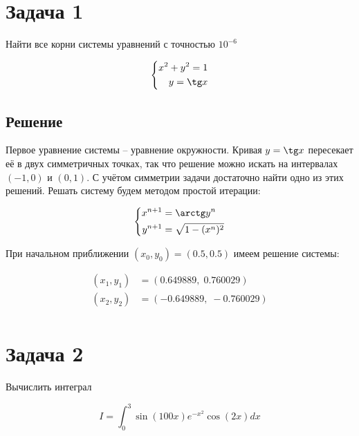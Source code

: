 \documentclass[a4paper,12pt]{article}
\begin{document}
\section*{Задача 1}

Найти все корни системы уравнений с точностью $10^{-6}$

\begin{equation*}
    \left\{
        \begin{aligned}
            x^2 + y^2 = 1 \\
            y = \tg x
        \end{aligned}
    \right.
\end{equation*}

\subsection*{Решение}

Первое уравнение системы -- уравнение окружности. Кривая $y = \tg x$ пересекает её в двух симметричных точках, так что решение можно искать на интервалах $(-1, 0)$ и $(0, 1)$. С учётом симметрии задачи достаточно найти одно из этих решений. Решать систему будем методом простой итерации:

\begin{equation*}
    \left\{
        \begin{aligned}
            x^{n + 1} &= \arctg y^n \\
            y^{n + 1} &= \sqrt{1 - (x^n)^2}
        \end{aligned}
    \right.
\end{equation*}

При начальном приближении $(x_0, y_0) = (0.5, 0.5)$ имеем решение системы:

\begin{align*}
    (x_1, y_1) &= (0.649889, \; 0.760029) \\
    (x_2, y_2) &= (-0.649889, \; -0.760029) \\
\end{align*}

\section*{Задача 2}

Вычислить интеграл

\begin{equation*}
    I = \int_0^3 \sin (100 x) e^{- x ^2} \cos (2 x) dx
\end{equation*}
\end{document}
